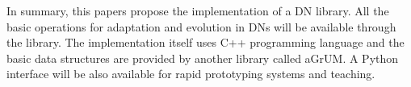 \documentclass[runningheads,a4paper]{llncs}
\begin{document}
In summary, this papers propose the implementation of a DN library.
All the basic operations for adaptation and evolution in DNs will be available through the library.
The implementation itself uses C++ programming language and the basic data structures are provided by another library called aGrUM.
A Python interface will be also available for rapid prototyping systems and teaching.



\end{document}
